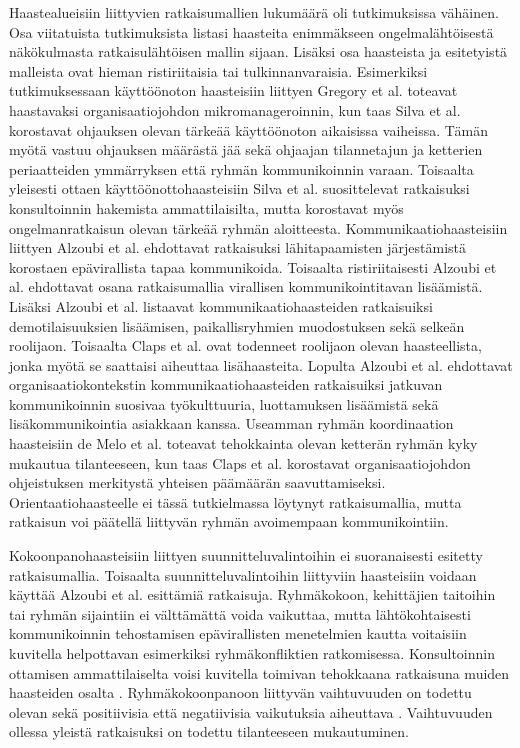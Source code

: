 Haastealueisiin liittyvien ratkaisumallien lukumäärä oli tutkimuksissa vähäinen. Osa viitatuista tutkimuksista listasi haasteita enimmäkseen ongelmalähtöisestä näkökulmasta ratkaisulähtöisen mallin sijaan. Lisäksi osa haasteista ja esitetyistä malleista ovat hieman ristiriitaisia tai tulkinnanvaraisia. Esimerkiksi tutkimuksessaan käyttöönoton haasteisiin liittyen Gregory et al. \cite{GREGORY201692} toteavat haastavaksi organisaatiojohdon mikromanageroinnin, kun taas Silva et al. \cite{SELLERISILVA201520} korostavat ohjauksen olevan tärkeää käyttöönoton aikaisissa vaiheissa. Tämän myötä vastuu ohjauksen määrästä jää sekä ohjaajan tilannetajun ja ketterien periaatteiden ymmärryksen että ryhmän kommunikoinnin varaan. Toisaalta yleisesti ottaen käyttöönottohaasteisiin Silva et al. suosittelevat ratkaisuksi konsultoinnin hakemista ammattilaisilta, mutta korostavat myös ongelmanratkaisun olevan tärkeää ryhmän aloitteesta. Kommunikaatiohaasteisiin liittyen Alzoubi et al. \cite{ALZOUBI201622} ehdottavat ratkaisuksi lähitapaamisten järjestämistä korostaen epävirallista tapaa kommunikoida. Toisaalta ristiriitaisesti Alzoubi et al. ehdottavat osana ratkaisumallia virallisen kommunikointitavan lisäämistä. Lisäksi Alzoubi et al. listaavat kommunikaatiohaasteiden ratkaisuiksi demotilaisuuksien lisäämisen, paikallisryhmien muodostuksen sekä selkeän roolijaon. Toisaalta Claps et al. \cite{CLAPS201521} ovat todenneet roolijaon olevan haasteellista, jonka myötä se saattaisi aiheuttaa lisähaasteita. Lopulta Alzoubi et al. \cite{ALZOUBI201622} ehdottavat organisaatiokontekstin kommunikaatiohaasteiden ratkaisuiksi jatkuvan kommunikoinnin suosivaa työkulttuuria, luottamuksen lisäämistä sekä lisäkommunikointia asiakkaan kanssa. Useamman ryhmän koordinaation haasteisiin de Melo et al. \cite{DEOMELO2013412} toteavat tehokkainta olevan ketterän ryhmän kyky mukautua tilanteeseen, kun taas Claps et al. \cite{CLAPS201521} korostavat organisaatiojohdon ohjeistuksen merkitystä yhteisen päämäärän saavuttamiseksi. Orientaatiohaasteelle ei tässä tutkielmassa löytynyt ratkaisumallia, mutta ratkaisun voi päätellä liittyvän ryhmän avoimempaan kommunikointiin.

Kokoonpanohaasteisiin liittyen suunnitteluvalintoihin ei suoranaisesti esitetty ratkaisumallia. Toisaalta suunnitteluvalintoihin liittyviin haasteisiin voidaan käyttää Alzoubi et al. \cite{ALZOUBI201622} esittämiä ratkaisuja. Ryhmäkokoon, kehittäjien taitoihin tai ryhmän sijaintiin ei välttämättä voida vaikuttaa, mutta lähtökohtaisesti kommunikoinnin tehostamisen epävirallisten menetelmien kautta voitaisiin kuvitella helpottavan esimerkiksi ryhmäkonfliktien ratkomisessa. Konsultoinnin ottamisen ammattilaiselta voisi kuvitella toimivan tehokkaana ratkaisuna muiden haasteiden osalta \cite{SELLERISILVA201520}. Ryhmäkokoonpanoon liittyvän vaihtuvuuden on todettu olevan sekä positiivisia että negatiivisia vaikutuksia aiheuttava \cite{DEOMELO2013412}. Vaihtuvuuden ollessa yleistä ratkaisuksi on todettu tilanteeseen mukautuminen.

